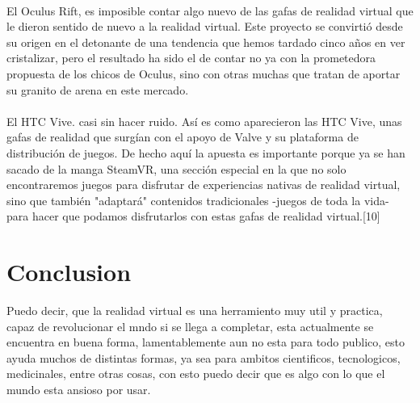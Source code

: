 \documentclass{bmcart}
\begin{document}
\paragraph{}
El Oculus Rift, es imposible contar algo nuevo de las gafas de realidad virtual que le dieron sentido de nuevo a la realidad virtual. Este proyecto se convirtió desde su origen en el detonante de una tendencia que hemos tardado cinco años en ver cristalizar, pero el resultado ha sido el de contar no ya con la prometedora propuesta de los chicos de Oculus, sino con otras muchas que tratan de aportar su granito de arena en este mercado.
\paragraph{}
El HTC Vive. casi sin hacer ruido. Así es como aparecieron las HTC Vive, unas gafas de realidad que surgían con el apoyo de Valve y su plataforma de distribución de juegos. De hecho aquí la apuesta es importante porque ya se han sacado de la manga SteamVR, una sección especial en la que no solo encontraremos juegos para disfrutar de experiencias nativas de realidad virtual, sino que también "adaptará" contenidos tradicionales -juegos de toda la vida- para hacer que podamos disfrutarlos con estas gafas de realidad virtual.[10]

\section*{Conclusion}
Puedo decir, que la realidad virtual es una herramiento muy util y practica, capaz de revolucionar el mndo si se llega a completar, esta actualmente se encuentra en buena forma, lamentablemente aun no esta para todo publico, esto ayuda muchos de distintas formas, ya sea para ambitos cientificos, tecnologicos, medicinales, entre otras cosas, con esto puedo decir que es algo con lo que el mundo esta ansioso por usar.
\end{document}
